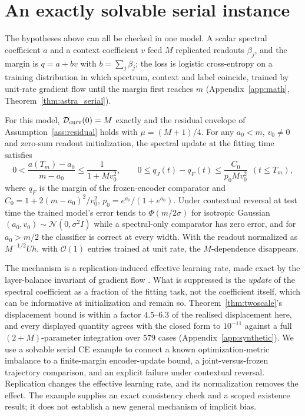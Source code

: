 \section{An exactly solvable serial instance}
\label{sec:instance}

The hypotheses above can all be checked in one model. A scalar spectral
coefficient $a$ and a context coefficient $v$ feed $M$ replicated readouts
$\beta_j$, and the margin is $q=a+bv$ with $b=\sum_j\beta_j$; the loss is
logistic cross-entropy on a training distribution in which spectrum,
context and label coincide, trained by unit-rate gradient flow until the
margin first reaches $m$ (Appendix~\ref{app:math},
Theorem~\ref{thm:astra_serial}).

\begin{theorem}
\label{thm:instance}
For this model, $\mathcal{D}_{\mathrm{curv}}(0)=M$ exactly and the residual envelope of
Assumption~\ref{ass:residual} holds with $\mu=(M+1)/4$. For any
$a_0<m$, $v_0\ne0$ and zero-sum readout initialization, the spectral update
at the fitting time satisfies
\[
  0<\frac{a(T_m)-a_0}{m-a_0}\le\frac{1}{1+Mv_0^2},
  \qquad
  0\le q_J(t)-q_F(t)\le\frac{C_0}{p_0Mv_0^2}\ \ (t\le T_m),
\]
where $q_F$ is the margin of the frozen-encoder comparator and
$C_0=1+2(m-a_0)^2/v_0^2$, $p_0=e^{a_0}/(1+e^{a_0})$. Under contextual
reversal at test time the trained model's error tends to $\Phi(m/2\sigma)$
for isotropic Gaussian $(a_0,v_0)\sim\mathcal{N}(0,\sigma^2I)$ while a
spectral-only comparator has zero error, and for $a_0>m/2$ the classifier is
correct at every width. With the readout normalized as $M^{-1/2}Uh$, with
$\mathcal{O}(1)$ entries trained at unit rate, the $M$-dependence
disappears.
\end{theorem}

The mechanism is a replication-induced effective learning rate, made exact
by the layer-balance invariant of gradient flow
\citep{astra_du2018balance}. What is suppressed is the \emph{update} of the
spectral coefficient as a fraction of the fitting task, not the coefficient
itself, which can be informative at initialization and remain so.
Theorem~\ref{thm:twoscale}'s displacement bound is within a factor
$4.5$--$6.3$ of the realised displacement here, and every displayed
quantity agrees with the closed form to
$10^{-11}$ against a full $(2+M)$-parameter integration over $579$ cases
(Appendix~\ref{app:synthetic}). We use a solvable serial CE
example to connect a known optimization-metric imbalance to a finite-margin
encoder-update bound, a joint-versus-frozen trajectory comparison, and an
explicit failure under contextual reversal. Replication changes the
effective learning rate, and its normalization removes the effect. The
example supplies an exact consistency check and a scoped existence result;
it does not establish a new general mechanism of implicit bias.


